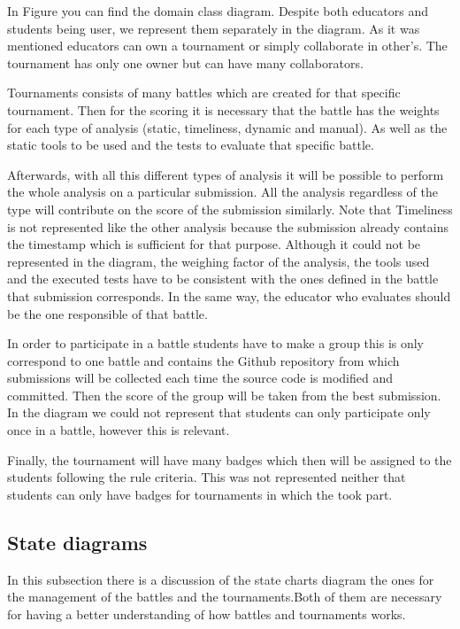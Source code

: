 In Figure  you can find the domain class diagram. Despite both educators and students being user, we represent  them separately in the diagram.  As it was mentioned educators can own a tournament or simply collaborate in other's. The tournament has only one owner but can have many collaborators. 

Tournaments consists of many battles which are created for that specific tournament. Then for the scoring it is necessary that the battle has the weights for each type of analysis (static, timeliness, dynamic and manual). As well as the static tools to be used and the tests to evaluate that specific battle.

Afterwards, with all this different types of analysis it will be possible to perform the whole analysis on a particular submission. All the analysis regardless of the type will contribute on the score of the submission similarly. Note that Timeliness is not represented like the other analysis because the submission already contains the timestamp which is sufficient for that purpose. Although it could not be represented in the diagram, the weighing factor of the analysis, the tools used and the executed tests have to be consistent with the ones defined in the battle that submission corresponds. In the same way, the educator who evaluates should be the one responsible of that battle.

In order to participate in a battle students have to make a group this is only correspond to one battle and contains the Github repository from which submissions will be collected each time the source code is modified and committed. Then the score of the group will be taken from the best submission. In the diagram we could not represent that students can only participate only once in a battle, however this is relevant.

Finally, the tournament will have many badges which then will be assigned to the students following the rule criteria. This was not represented neither that students can only have badges for tournaments in which the took part.

\subsection{State diagrams}
In this subsection there is a discussion of the state charts diagram the ones for the management of the battles and the tournaments.Both of them are necessary for having a better understanding of how battles and tournaments works.

